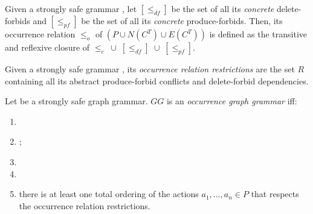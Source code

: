 \begin{definition} Given a strongly safe grammar \doublyTypedGraphGrammarCore{}, let $[\leq_{df}]$ be the set of all its \emph{concrete} delete-forbids and $[\leq_{pf}]$ be the set of all its \emph{concrete} produce-forbids. Then, its occurrence relation $\leq_o$ of $(P \cup N(C^T) \cup E(C^T))$ is defined as the transitive and reflexive closure of \mbox{$\leq_{c}$ $\cup$ $[\leq_{df}]$ $\cup$ $[\leq_{pf}]$}.
\end{definition}

\begin{definition} Given a strongly safe grammar \doublyTypedGraphGrammarCore{}, its \emph{occurrence relation restrictions} are the set $R$ containing all its abstract produce-forbid conflicts and delete-forbid dependencies.
\end{definition}

\begin{definition}\label{def:ogg} Let \doublyTypedGraphGrammarCore{} be a strongly safe graph grammar. $GG$ is an \emph{occurrence graph grammar} iff:

  \begin{enumerate}
    \item {}
    \item {};
    \item {}
    \item {}
    \item there is at least one total ordering of the actions $a_1,\ldots,a_n \in P$ that respects the occurrence relation restrictions.
  \end{enumerate}
\end{definition}

